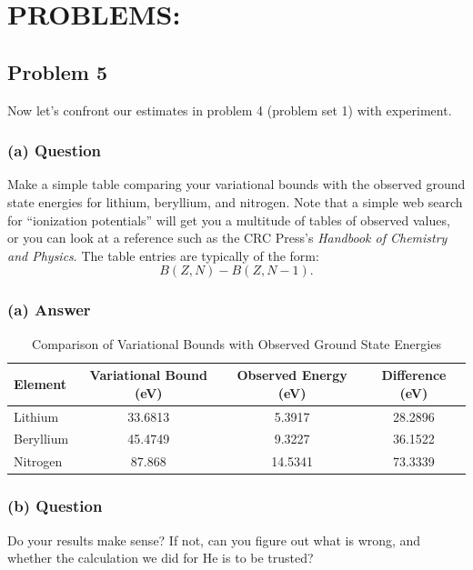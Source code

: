 \documentclass{article}
\begin{document}
\section*{PROBLEMS:}

\subsection*{Problem 5}
Now let's confront our estimates in problem 4 (problem set 1) with experiment.

\subsubsection*{(a) Question}
Make a simple table comparing your variational bounds with the observed ground state energies for lithium, beryllium, and nitrogen. Note that a simple web search for ``ionization potentials'' will get you a multitude of tables of observed values, or you can look at a reference such as the CRC Press's \textit{Handbook of Chemistry and Physics}. The table entries are typically of the form:
\begin{equation*}
    B(Z, N) - B(Z, N - 1).
\end{equation*}

\subsubsection*{(a) Answer}
\begin{table}[h!]
\centering
\begin{tabular}{lccc}
\toprule
Element & Variational Bound (eV) & Observed Energy (eV) & Difference (eV) \\
\midrule
Lithium    & 33.6813 & 5.3917 & 28.2896 \\
Beryllium  & 45.4749 & 9.3227 & 36.1522 \\
Nitrogen   & 87.868 & 14.5341 & 73.3339 \\
\bottomrule
\end{tabular}
\caption{Comparison of Variational Bounds with Observed Ground State Energies}
\label{tab:comparison}
\end{table}

\subsubsection*{(b) Question}
Do your results make sense? If not, can you figure out what is wrong, and whether the calculation we did for He is to be trusted?
\end{document}
